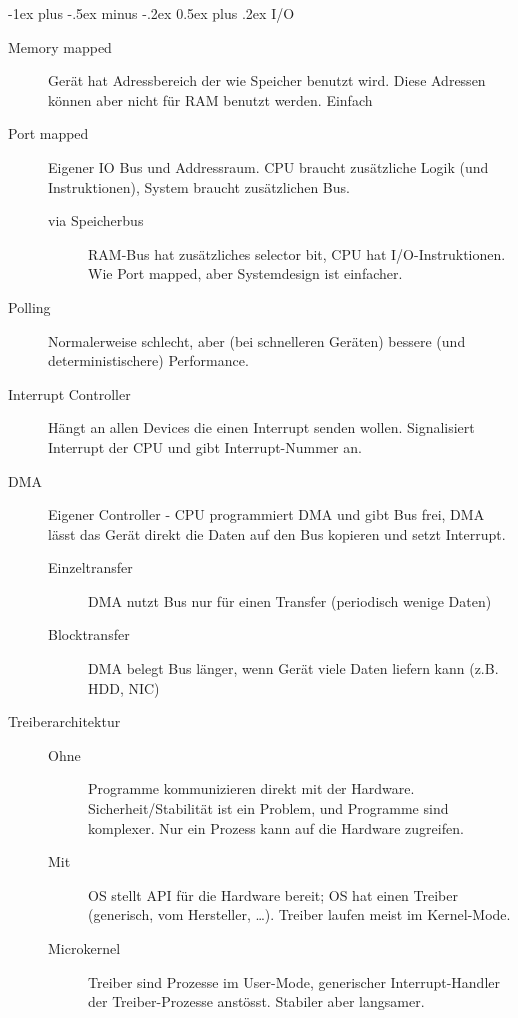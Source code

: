 \documentclass[10pt,landscape,a4paper]{article}
\makeatletter
\renewcommand{\section}{\@startsection{section}{1}{0mm}%
                                {-1ex plus -.5ex minus -.2ex}%
                                {0.5ex plus .2ex}%
                                {\normalfont\large\bfseries}}
\makeatother
\begin{document}
\begin{multicols*}{3}
\section{I/O}

\begin{description}
\item[Memory mapped] Gerät hat Adressbereich der wie Speicher benutzt wird.
  Diese Adressen können aber nicht für RAM benutzt werden. Einfach
\item[Port mapped] Eigener IO Bus und Addressraum. CPU braucht zusätzliche Logik
  (und Instruktionen), System braucht zusätzlichen Bus.
  \begin{description}
    \item[via Speicherbus] RAM-Bus hat zusätzliches selector bit, CPU
      hat I/O-Instruktionen. Wie Port mapped, aber Systemdesign ist einfacher.
  \end{description}
\item[Polling] Normalerweise schlecht, aber (bei schnelleren Geräten) bessere
  (und deterministischere) Performance.
\item[Interrupt Controller] Hängt an allen Devices die einen Interrupt senden
  wollen. Signalisiert Interrupt der CPU und gibt Interrupt-Nummer an.
\item[DMA] Eigener Controller - CPU programmiert DMA und gibt Bus frei, DMA
  lässt das Gerät direkt die Daten auf den Bus kopieren und setzt Interrupt.
  \begin{description}
  \item[Einzeltransfer] DMA nutzt Bus nur für einen Transfer (periodisch wenige
    Daten)
  \item[Blocktransfer] DMA belegt Bus länger, wenn Gerät viele Daten liefern
    kann (z.B. HDD, NIC)
  \end{description}
\item[Treiberarchitektur] \strut
  \begin{description}
    \item[Ohne] Programme kommunizieren direkt mit der Hardware.
      Sicherheit/Stabilität ist ein Problem, und Programme sind komplexer.
      Nur ein Prozess kann auf die Hardware zugreifen.
    \item[Mit] OS stellt API für die Hardware bereit; OS hat einen Treiber
      (generisch, vom Hersteller, …). Treiber laufen meist im Kernel-Mode.
    \item[Microkernel] Treiber sind Prozesse im User-Mode, generischer
      Interrupt-Handler der Treiber-Prozesse anstösst. Stabiler aber langsamer.
  \end{description}
\end{description}


\end{multicols*}
\end{document}
